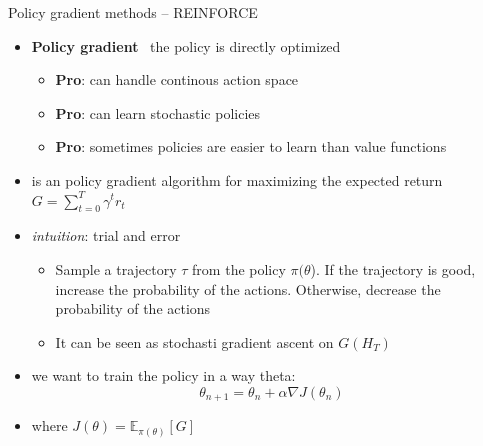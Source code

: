 \documentclass[presentation, 9pt]{beamer}\mode<presentation>{\usetheme{AMSBolognaFC}}
\begin{document}
\begin{frame}{Policy gradient methods -- REINFORCE}
	\begin{itemize}
		\item \textbf{Policy gradient} \faArrowRight \, the policy is directly optimized
		\begin{itemize}
			\item \textbf{Pro}: can handle continous action space
			\item \textbf{Pro}: can learn stochastic policies
			\item \textbf{Pro}: sometimes policies are easier to learn than value functions
		\end{itemize}
		\item {} is an policy gradient algorithm for maximizing the expected return $G = \sum_{t=0}^T \gamma^t r_t$
		\item \emph{intuition}: trial and error
		\begin{itemize}
			\item Sample a trajectory $\tau$ from the policy $\pi(\theta$). If the trajectory is good, increase the probability of the actions. Otherwise, decrease the probability of the actions
			\item It can be seen as stochasti gradient ascent on $G(H_T)$
		\end{itemize}
		\item we want to train the policy in a way theta:
		\begin{equation*}
			\theta_{n+1} = \theta_{n} + \alpha \nabla J(\theta_n)
		\end{equation*}
		\item where $J(\theta) = \mathbb{E}_{\pi(\theta)}[G]$
	\end{itemize}
\end{frame}	
\end{document}
